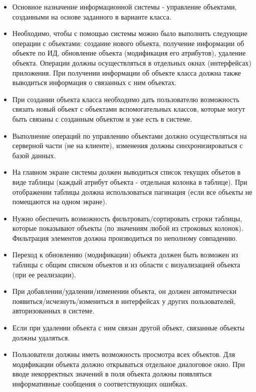 \documentclass[12pt,a4paper]{article}
\begin{document}
\begin{itemize}[leftmargin=*]

\item Основное назначение информационной системы - управление объектами, созданными на основе заданного в варианте класса.

\item Необходимо, чтобы с помощью системы можно было выполнить следующие операции с объектами: создание нового объекта, получение информации об объекте по ИД, обновление объекта (модификация его атрибутов), удаление объекта. Операции должны осуществляться в отдельных окнах (интерфейсах) приложения. При получении информации об объекте класса должна также выводиться информация о связанных с ним объектах.

\item При создании объекта класса необходимо дать пользователю возможность связать новый объект с объектами вспомогательных классов, которые могут быть связаны с созданным объектом и уже есть в системе.

\item Выполнение операций по управлению объектами должно осуществляться на серверной части (не на клиенте), изменения должны синхронизироваться с базой данных.

\item На главном экране системы должен выводиться список текущих объетов в виде таблицы (каждый атрибут объекта - отдельная колонка в таблице). При отображении таблицы должна использоваться пагинация (если все объекты не помещаются на одном экране).

\item Нужно обеспечить возможность фильтровать/сортировать строки таблицы, которые показывают объекты (по значениям любой из строковых колонок). Фильтрация элементов должна производиться по неполному совпадению.

\item Переход к обновлению (модификации) объекта должен быть возможен из таблицы с общим списком объектов и из области с визуализацией объекта (при ее реализации).

\item При добавлении/удалении/изменении объекта, он должен автоматически появиться/исчезнуть/измениться в интерфейсах у других пользователей, авторизованных в системе.

\item Если при удалении объекта с ним связан другой объект, связанные объекты должны удаляться.

\item Пользователи должны иметь возможность просмотра всех объектов. Для модификации объекта должно открываться отдельное диалоговое окно. При вводе некорректных значений в поля объекта должны появляться информативные сообщения о соответствующих ошибках.

\end{itemize}
\end{document}
